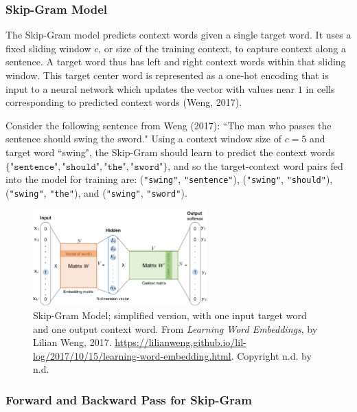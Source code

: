 \subsubsection{Skip-Gram Model} \label{sec:SkipGram}

The Skip-Gram model predicts context words given a single target word. It uses a fixed sliding window $c$, or size of the training context, to capture context along a sentence. A target word thus has left and right context words within that sliding window. This target center word is represented as a one-hot encoding that is input to a neural network which updates the vector with values near $1$ in cells corresponding to predicted context words (Weng, 2017).  

Consider the following sentence from Weng (2017): ``The man who passes the sentence should swing the sword." Using a context window size of $c = 5$ and target word ``swing", the Skip-Gram should learn to predict the context words $\{\texttt{"sentence"}, \texttt{"should"}, \texttt{"the"}, \texttt{"sword"} \}$, and so the target-context word pairs fed into the model for training are: (\texttt{"swing"}, \texttt{"sentence"}), (\texttt{"swing"}, \texttt{"should"}), (\texttt{"swing"}, \texttt{"the"}), and (\texttt{"swing"}, \texttt{"sword"}).  

\begin{figure}[h]
\vspace{-5pt}
\centering
\includegraphics[width=0.6\textwidth]{imgs/skipgram_image.png}
\vspace{-5pt}
\caption{\footnotesize Skip-Gram Model; simplified version, with one input target word and one output context word. From \emph{Learning Word Embeddings}, by Lilian Weng, 2017. \url{https://lilianweng.github.io/lil-log/2017/10/15/learning-word-embedding.html}. Copyright n.d. by n.d.}
\label{fig:SkipGram}
\vspace{-5pt}
\end{figure}

\subsubsection{Forward and Backward Pass for Skip-Gram}


